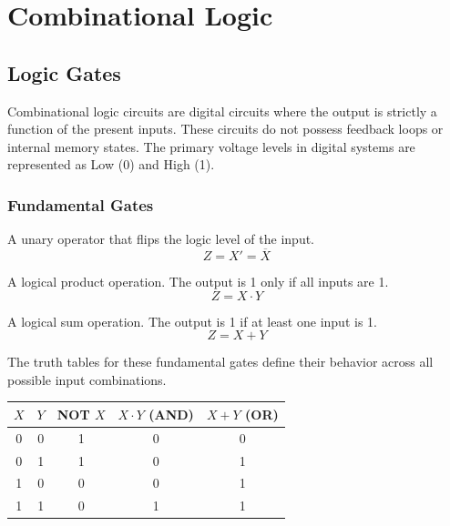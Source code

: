 \chapter{Combinational Logic}

\section{Logic Gates}

\begin{definition}
Combinational logic circuits are digital circuits where the output is strictly a function of the present inputs. These circuits do not possess feedback loops or internal memory states. The primary voltage levels in digital systems are represented as Low (0) and High (1).
\end{definition}

\subsection{Fundamental Gates}

\begin{vocabulary}
A unary operator that flips the logic level of the input.
\begin{equation}
Z = X' = \overline{X}
\end{equation}
\end{vocabulary}

\begin{vocabulary}[AND]
A logical product operation. The output is 1 only if all inputs are 1.
\begin{equation}
Z = X \cdot Y
\end{equation}
\end{vocabulary}

\begin{vocabulary}[OR]
A logical sum operation. The output is 1 if at least one input is 1.
\begin{equation}
Z = X + Y
\end{equation}
\end{vocabulary}

\begin{remark}
The truth tables for these fundamental gates define their behavior across all possible input combinations.
\end{remark}

\begin{center}
\begin{tabular}{|c|c||c|c|c|}
\hline
$X$ & $Y$ & NOT $X$ & $X \cdot Y$ (AND) & $X + Y$ (OR) \\
\hline
0 & 0 & 1 & 0 & 0 \\
0 & 1 & 1 & 0 & 1 \\
1 & 0 & 0 & 0 & 1 \\
1 & 1 & 0 & 1 & 1 \\
\hline
\end{tabular}
\end{center}

